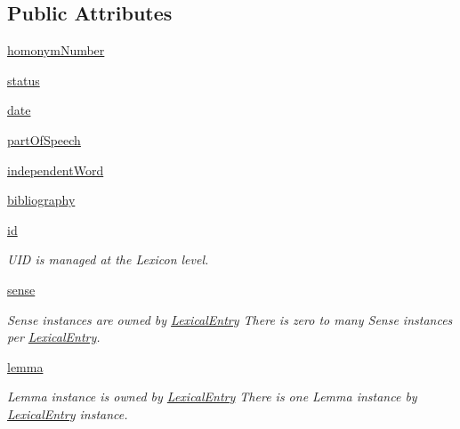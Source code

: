 \subsection*{Public Attributes}
\begin{DoxyCompactItemize}
\item 
\hyperlink{classlmf_1_1src_1_1core_1_1lexical__entry_1_1_lexical_entry_a402073c8f71f2f779725c6aeefa5df49}{homonym\+Number}
\item 
\hyperlink{classlmf_1_1src_1_1core_1_1lexical__entry_1_1_lexical_entry_aaec5fa141d51ae38a0346b0f863f4522}{status}
\item 
\hyperlink{classlmf_1_1src_1_1core_1_1lexical__entry_1_1_lexical_entry_ac6d96435547dea66e1433966098249b8}{date}
\item 
\hyperlink{classlmf_1_1src_1_1core_1_1lexical__entry_1_1_lexical_entry_ad59e408fda5122725f6f361e08739916}{part\+Of\+Speech}
\item 
\hyperlink{classlmf_1_1src_1_1core_1_1lexical__entry_1_1_lexical_entry_a6e84227c5c4a0d4d6574f3daa19ebac4}{independent\+Word}
\item 
\hyperlink{classlmf_1_1src_1_1core_1_1lexical__entry_1_1_lexical_entry_a27dfa720ca4c7839a105bd7b671762ee}{bibliography}
\item 
\hyperlink{classlmf_1_1src_1_1core_1_1lexical__entry_1_1_lexical_entry_a28fe2bf7e53e223a6919bb38b6d55256}{id}
\begin{DoxyCompactList}\small\item\em U\+I\+D is managed at the Lexicon level. \end{DoxyCompactList}\item 
\hyperlink{classlmf_1_1src_1_1core_1_1lexical__entry_1_1_lexical_entry_a92b1d39e09a8af1a90e780ef5780cc92}{sense}
\begin{DoxyCompactList}\small\item\em Sense instances are owned by \hyperlink{classlmf_1_1src_1_1core_1_1lexical__entry_1_1_lexical_entry}{Lexical\+Entry} There is zero to many Sense instances per \hyperlink{classlmf_1_1src_1_1core_1_1lexical__entry_1_1_lexical_entry}{Lexical\+Entry}. \end{DoxyCompactList}\item 
\hyperlink{classlmf_1_1src_1_1core_1_1lexical__entry_1_1_lexical_entry_a25e285f1f40cf8c4a17d021c2d2b878f}{lemma}
\begin{DoxyCompactList}\small\item\em Lemma instance is owned by \hyperlink{classlmf_1_1src_1_1core_1_1lexical__entry_1_1_lexical_entry}{Lexical\+Entry} There is one Lemma instance by \hyperlink{classlmf_1_1src_1_1core_1_1lexical__entry_1_1_lexical_entry}{Lexical\+Entry} instance. \end{DoxyCompactList}\item 

\end{DoxyCompactItemize}
